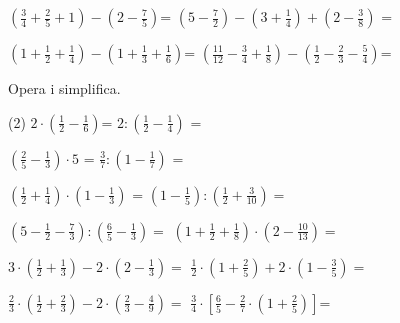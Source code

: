 \begin{mylist}
\begin{tasks}
\task $\left(\frac{3}{4} +\frac{2}{5} +1\right)-\left(2-\frac{7}{5} \right)$=                 \task $\left(5-\frac{7}{2} \right)-\left(3+\frac{1}{4} \right)+\left(2-\frac{3}{8} \right)$ =
\vsoo

\task $\left(1+\frac{1}{2} +\frac{1}{4} \right)-$$\left(1+\frac{1}{3} +\frac{1}{6} \right)$=          \task $\left(\frac{11}{12} -\frac{3}{4} +\frac{1}{8} \right)-\left(\frac{1}{2} -\frac{2}{3} -\frac{5}{4} \right)$=
\end{tasks}
\vsooo
{}


 
\exer[1]  Opera i simplifica.
 
\begin{tasks}(2)
\task $2\cdot \left(\frac{1}{2} -\frac{1}{6} \right)$=         \task $2:\left(\frac{1}{2} -\frac{1}{4} \right)$  =

\task $\left(\frac{2}{5} -\frac{1}{3} \right)\cdot 5$   =       \task $\frac{3}{7} :\left(1-\frac{1}{7} \right)$ =

\task  $\left(\frac{1}{2} +\frac{1}{4} \right)\cdot \left(1-\frac{1}{3} \right)$ =      \task$\left(1-\frac{1}{5} \right):\left(\frac{1}{2} +\frac{3}{10} \right)=$

\task $\left(5-\frac{1}{2} -\frac{7}{3} \right):\left(\frac{6}{5} -\frac{1}{3} \right)=$     \task $\left(1+\frac{1}{2} +\frac{1}{8} \right)\cdot \left(2-\frac{10}{13} \right)=$

\task $3\cdot \left(\frac{1}{2} +\frac{1}{3} \right)-2\cdot \left(2-\frac{1}{3} \right)=$                          \task $\frac{1}{2} \cdot \left(1+\frac{2}{5} \right)+2\cdot \left(1-\frac{3}{5} \right)=$

\task $\frac{2}{3} \cdot \left(\frac{1}{2} +\frac{2}{3} \right)-2\cdot \left(\frac{2}{3} -\frac{4}{9} \right)=$   \task $\frac{3}{4} \cdot \left[\frac{6}{5} -\frac{2}{7} \cdot \left(1+\frac{2}{5} \right)\right]$=
\end{tasks}
 
 \begin{comment}
	\exer  La mitjana harmònica es defineix com a $H(a,b)=\frac{1}{\frac{\frac{1}{a}+\frac{1}{b}}{2}}$, l'invers de la mitjana aritmètica dels inversos.
 

a) Demostra que H(a, b) = $\frac{2ab}{a+b} $  \quad\quad  b) Troba $H\left(\frac{3}{2} ,\frac{11}{3} \right)$ 
\end{comment}
 

\end{mylist}
